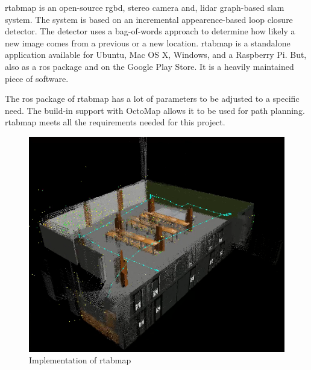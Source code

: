 \acs{rtabmap} is an open\hyp{}source \acs{rgbd}, stereo camera and, \acs{lidar} graph\hyp{}based \acs{slam} system. The system is based on an incremental appearence\hyp{}based loop closure detector. The detector uses a bag\hyp{}of\hyp{}words approach to determine how likely a new image comes from a previous or a new location. \acs{rtabmap} is a standalone application available for Ubuntu, Mac OS X, Windows, and a Raspberry Pi. But, also as a \acs{ros} package and on the Google Play Store. It is a heavily maintained piece of software. \cite{rtabmap_introlab}

The \acs{ros} package of \acs{rtabmap} has a lot of parameters to be adjusted to a specific need. The build\hyp{}in support with OctoMap allows it to be used for path planning. \acs{rtabmap} meets all the requirements needed for this project.

\begin{figure}[!h]
  \centering
  \includegraphics[width=0.7\linewidth]{images/rtabmap_implementation.png}
  \caption{Implementation of \acs{rtabmap}}
  \label{fig:rtabmap_implementation}
\end{figure}